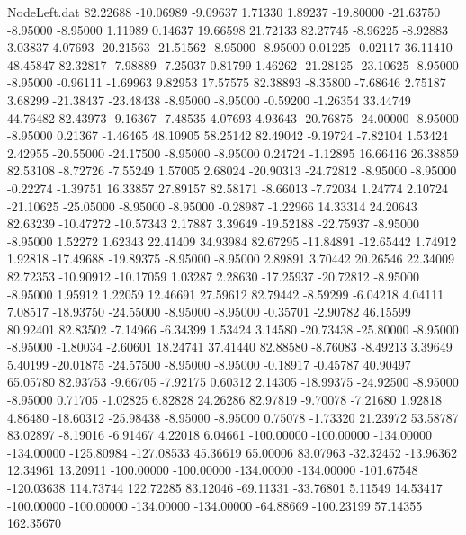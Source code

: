 \begin{filecontents}{NodeLeft.dat}
  82.22688  -10.06989   -9.09637     1.71330    1.89237  -19.80000  -21.63750   -8.95000   -8.95000    1.11989    0.14637   19.66598   21.72133
  82.27745   -8.96225   -8.92883     3.03837    4.07693  -20.21563  -21.51562   -8.95000   -8.95000    0.01225   -0.02117   36.11410   48.45847
  82.32817   -7.98889   -7.25037     0.81799    1.46262  -21.28125  -23.10625   -8.95000   -8.95000   -0.96111   -1.69963    9.82953   17.57575
  82.38893   -8.35800   -7.68646     2.75187    3.68299  -21.38437  -23.48438   -8.95000   -8.95000   -0.59200   -1.26354   33.44749   44.76482
  82.43973   -9.16367   -7.48535     4.07693    4.93643  -20.76875  -24.00000   -8.95000   -8.95000    0.21367   -1.46465   48.10905   58.25142
  82.49042   -9.19724   -7.82104     1.53424    2.42955  -20.55000  -24.17500   -8.95000   -8.95000    0.24724   -1.12895   16.66416   26.38859
  82.53108   -8.72726   -7.55249     1.57005    2.68024  -20.90313  -24.72812   -8.95000   -8.95000   -0.22274   -1.39751   16.33857   27.89157
  82.58171   -8.66013   -7.72034     1.24774    2.10724  -21.10625  -25.05000   -8.95000   -8.95000   -0.28987   -1.22966   14.33314   24.20643
  82.63239  -10.47272  -10.57343     2.17887    3.39649  -19.52188  -22.75937   -8.95000   -8.95000    1.52272    1.62343   22.41409   34.93984
  82.67295  -11.84891  -12.65442     1.74912    1.92818  -17.49688  -19.89375   -8.95000   -8.95000    2.89891    3.70442   20.26546   22.34009
  82.72353  -10.90912  -10.17059     1.03287    2.28630  -17.25937  -20.72812   -8.95000   -8.95000    1.95912    1.22059   12.46691   27.59612
  82.79442   -8.59299   -6.04218     4.04111    7.08517  -18.93750  -24.55000   -8.95000   -8.95000   -0.35701   -2.90782   46.15599   80.92401
  82.83502   -7.14966   -6.34399     1.53424    3.14580  -20.73438  -25.80000   -8.95000   -8.95000   -1.80034   -2.60601   18.24741   37.41440
  82.88580   -8.76083   -8.49213     3.39649    5.40199  -20.01875  -24.57500   -8.95000   -8.95000   -0.18917   -0.45787   40.90497   65.05780
  82.93753   -9.66705   -7.92175     0.60312    2.14305  -18.99375  -24.92500   -8.95000   -8.95000    0.71705   -1.02825    6.82828   24.26286
  82.97819   -9.70078   -7.21680     1.92818    4.86480  -18.60312  -25.98438   -8.95000   -8.95000    0.75078   -1.73320   21.23972   53.58787
  83.02897   -8.19016   -6.91467     4.22018    6.04661 -100.00000 -100.00000 -134.00000 -134.00000 -125.80984 -127.08533   45.36619   65.00006
  83.07963  -32.32452  -13.96362    12.34961   13.20911 -100.00000 -100.00000 -134.00000 -134.00000 -101.67548 -120.03638  114.73744  122.72285
  83.12046  -69.11331  -33.76801     5.11549   14.53417 -100.00000 -100.00000 -134.00000 -134.00000  -64.88669 -100.23199   57.14355  162.35670

\end{filecontents}
